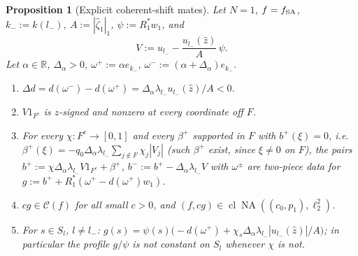 \documentclass[10pt]{amsart}
\newtheorem{proposition}[theorem]{Proposition}
\theoremstyle{definition}
\theoremstyle{remark}
\newcommand{\NA}{\operatorname{NA}}
\newcommand{\R}{\mathbb R}
\newcommand{\Cset}{\mathcal C}
\newcommand{\cl}{\operatorname{cl}}
\newcommand{\zh}{\hat z}
\begin{document}
\begin{proposition}[Explicit coherent-shift mates]\label{prop:II-SAmates}
Let $N=1$, $f=f_{\rm SA}$, $k_-:=k(l_-)$, $A:=|\hat\zeta_1|_1$, $\psi:=R_1^*w_1$, and
\[
 V:=u_{l_-}-\frac{u_{l_-}(\zh)}A\,\psi .
\]
Let $\alpha\in\R$, $\Delta_\alpha>0$, $\omega^+:=\alpha e_{k_-}$, $\omega^-:=(\alpha+
\Delta_\alpha)e_{k_-}$.
\begin{enumerate}
\item[(i)] $\Delta d=d(\omega^-)-d(\omega^+)=\Delta_\alpha\lambda_{l_-}u_{l_-}(\zh)/A<0$.
\item[(ii)] $V1_{F^c}$ is $z$-signed and nonzero at every coordinate off $F$.
\item[(iii)] For every $\chi:F^c\to[0,1]$ and every $\beta^+$ supported in $F$
with $b^+(\xi)=0$, i.e.\ $\beta^+(\xi)=-q_0\Delta_\alpha\lambda_{l_-}\sum_{j
\notin F}\chi_j|V_j|$ \textup{(}such $\beta^+$ exist, since $\xi\ne0$ on
$F$\textup{)}, the pairs $b^+:=\chi\Delta_\alpha\lambda_{l_-}V1_{F^c}+
\beta^+$, $b^-:=b^+-\Delta_\alpha\lambda_{l_-}V$ with $\omega^\pm$ are two-piece
data for $g:=b^++R_1^*(\omega^+-d(\omega^+)w_1)$.
\item[(iv)] $cg\in\Cset(f)$ for all small $c>0$, and $(f,cg)\in\cl\NA((c_0,p_1),
\ell_2^2)$.
\item[(v)] For $s\in S_l$, $l\ne l_-$: $g(s)=\psi(s)\big(-d(\omega^+)+\chi_s
\Delta_\alpha\lambda_{l_-}|u_{l_-}(\zh)|/A\big)$; in particular the profile
$g/\psi$ is not constant on $S_l$ whenever $\chi$ is not.
\end{enumerate}
\end{proposition}
\end{document}
